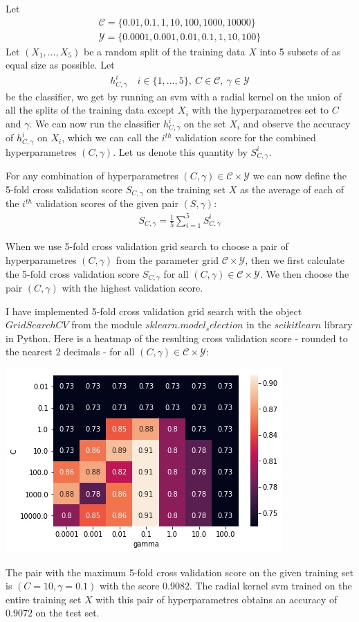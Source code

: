 Let 
\begin{align}
\mathcal{C}=\{0.01,0.1,1,10,100,1000,10000\}\\ 
\mathcal{Y} = \{0.0001,0.001,0.01,0.1,1,10,100 \}
\end{align}
Let $(X_1,...,X_5)$ be a random split of the training data $X$ into 5 subsets of as equal size as possible. Let 
\begin{align}
h^{i}_{C,\gamma} \quad i\in \{1,...,5 \},\ C\in \mathcal{C},\ \gamma \in \mathcal{Y}
\end{align}
be the classifier, we get by running an svm with a radial kernel on the union of all the splits of the training data except $X_i$ with the hyperparametres set to $C$ and $\gamma$. We can now run the classifier $h^i_{C,\gamma}$ on the set $X_i$ and observe the accuracy of $h^i_{C,\gamma}$ on $X_i$, which we can call the $i^{th}$ validation score for the combined hyperparametres $(C,\gamma)$. Let us denote this quantity by $S^i_{C,\gamma}$. 

For any combination of hyperparametres $(C,\gamma)\in \mathcal{C}\times \mathcal{Y}$ we can now define the 5-fold cross validation score $S_{C,\gamma}$ on the training set $X$ as the average of each of the $i^{th}$ validation scores of the given pair $(S,\gamma)$:
\begin{align}
S_{C,\gamma} = \frac{1}{5} \sum_{i=1}^5 S^i_{C,\gamma}
\end{align}

When we use 5-fold cross validation grid search to choose a pair of hyperparametres $(C,\gamma)$ from the parameter grid $\mathcal{C}\times \mathcal{Y}$, then we first calculate the 5-fold cross validation score $S_{C,\gamma}$ for all $(C,\gamma) \in \mathcal{C}\times \mathcal{Y}$. We then choose the pair $(C,\gamma)$ with the highest validation score. 

I have implemented 5-fold cross validation grid search with the object $GridSearchCV$ from the module $sklearn.model_selection$ in the $scikit learn$ library in Python. Here is a heatmap of the resulting cross validation score - rounded to the nearest 2 decimals - for all $(C,\gamma) \in \mathcal{C}\times \mathcal{Y}$:
\begin{center}
\includegraphics[scale=1]{svms/cv_heatmap.jpg}
\end{center}
The pair with the maximum 5-fold cross validation score on the given training set is $(C = 10,\gamma = 0.1)$ with the score $0.9082$. The radial kernel svm trained on the entire training set $X$ with this pair of hyperparametres obtains an accuracy of $0.9072$ on the test set.

